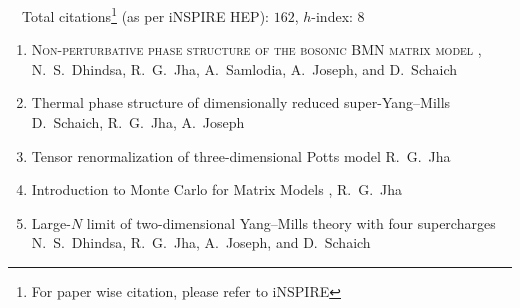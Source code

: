  {\faLeanpub}
~~Total citations\footnote{For paper wise citation, please refer to iNSPIRE} (as per iNSPIRE HEP): $162$, $h$-index: $8$
\begin{enumerate}
\item \textsc{Non-perturbative phase structure of the bosonic BMN matrix model}  \newline 
\hfill  {},    \newline 	
N.~S.~Dhindsa, R.~G.~Jha, A.~Samlodia, A.~Joseph, and D.~Schaich
\vspace{1mm} 
\item Thermal phase structure of dimensionally reduced super-Yang--Mills \newline 
{} \newline 
D.~Schaich, R.~G.~Jha, A.~Joseph
\vspace{1mm} 
\item Tensor renormalization of three-dimensional Potts model  \newline 
{} \newline 
R.~G.~Jha
\vspace{1mm} 
 \item Introduction to Monte Carlo for Matrix Models \newline 
{},  \newline  
 R.~G.~Jha
 \vspace{1mm} 
 \item Large-$N$ limit of two-dimensional Yang--Mills theory with four supercharges \newline 
{} \newline 
 N.~S.~Dhindsa, R.~G.~Jha, A.~Joseph, and D.~Schaich
 \vspace{1mm}  

\end{enumerate}
